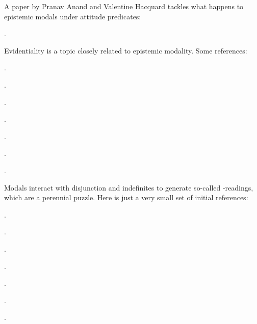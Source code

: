 {A paper by Pranav Anand and Valentine Hacquard tackles what happens to epistemic
modals under attitude predicates:

\begin{bibentrylist}
	\item {}.
\end{bibentrylist}

Evidentiality is a topic closely related to epistemic modality. Some
references:

\begin{bibentrylist}
  \item {}.
  \item {}.
  \item {}.
  \item {}.
  \item {}.
  \item {}.
  \item {}. 
\end{bibentrylist}

Modals interact with disjunction and indefinites to generate so-called
-readings, which are a perennial puzzle. Here is
just a very small set of initial references:

\begin{bibentrylist}
	\item {}.
	\item {}.
	\item {}.
	\item {}.
	\item {}.
	\item {}.
	\item {}.
\end{bibentrylist}

}



